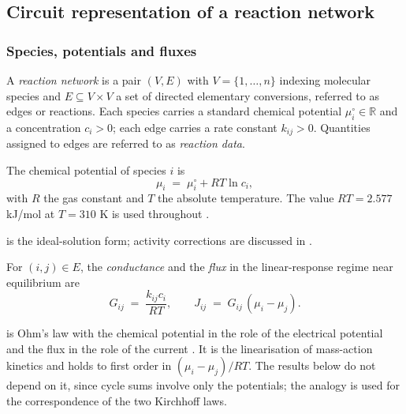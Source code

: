 \documentclass[11pt,a4paper]{article}
\theoremstyle{pstyle}
\theoremstyle{definition}
\theoremstyle{remark}
\newcommand{\R}{\mathbb{R}}
\begin{document}
\subsection{Circuit representation of a reaction network}
\label{sec:circuit}

\subsubsection{Species, potentials and fluxes}

\begin{definition}
\label{def:network}
A \emph{reaction network} is a pair $(V,E)$ with $V=\{1,\dots,n\}$
indexing molecular species and $E \subseteq V\times V$ a set of directed
elementary conversions, referred to as edges or reactions. Each species
carries a standard chemical potential $\mu_i^{\circ}\in\R$ and a
concentration $c_i>0$; each edge carries a rate constant $k_{ij}>0$.
Quantities assigned to edges are referred to as \emph{reaction data}.
\end{definition}

\begin{definition}
\label{def:mu}
The chemical potential of species $i$ is
\begin{equation}
  \mu_i \;=\; \mu_i^{\circ} + RT\ln c_i,
  \label{eq:mu}
\end{equation}
with $R$ the gas constant and $T$ the absolute temperature. The value
$RT=2.577$ kJ/mol at $T=310$ K is used throughout \citep{atkins2018}.
\end{definition}

 is the ideal-solution form; activity corrections are
discussed in .

\begin{definition}
\label{def:conductance}
For $(i,j)\in E$, the \emph{conductance} and the \emph{flux} in the
linear-response regime near equilibrium are
\begin{equation}
  G_{ij} \;=\; \frac{k_{ij}c_i}{RT},
  \qquad
  J_{ij} \;=\; G_{ij}\,(\mu_i - \mu_j).
  \label{eq:GJ}
\end{equation}
\end{definition}

 is Ohm's law with the chemical potential in the role of
the electrical potential and the flux in the role of the current
\citep{oster1971,beard2002,qian2005}. It is the linearisation of
mass-action kinetics and holds to first order in $(\mu_i-\mu_j)/RT$. The
results below do not depend on it, since cycle sums involve only the
potentials; the analogy is used for the correspondence of the two
Kirchhoff laws.
\end{document}
